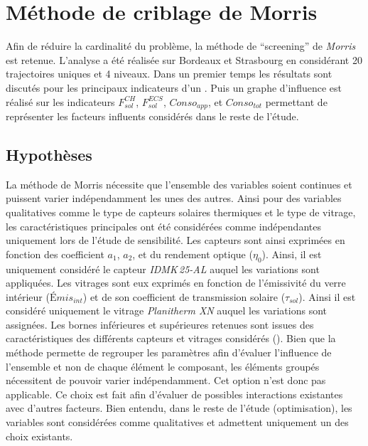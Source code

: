 \section{Méthode de criblage de Morris} %
\label{sec:methode_criblage_de_morris}
Afin de réduire la cardinalité du problème, la méthode de \enquote{screening} de
\textit{Morris} est retenue. L’analyse a été réalisée sur Bordeaux et Strasbourg en
considérant \num{20} trajectoires uniques et \num{4} niveaux. Dans un premier temps les
résultats sont discutés pour les principaux indicateurs d’un . Puis un graphe
d’influence est réalisé sur les indicateurs $F_{sol}^{CH}$, $F_{sol}^{ECS}$,
$Conso_{app}$, et $Conso_{tot}$ permettant de représenter les facteurs influents
considérés dans le reste de l’étude.

\subsection{Hypothèses} %
\label{sub:hypotheses}
La méthode de Morris nécessite que l’ensemble des variables soient continues
et puissent varier indépendamment les unes des autres. Ainsi pour des variables
qualitatives comme le type de capteurs solaires thermiques et le type de vitrage,
les caractéristiques principales ont été considérées comme indépendantes uniquement
lors de l’étude de sensibilité.
Les capteurs sont ainsi exprimées en fonction des coefficient $a_{1}$, $a_{2}$, et
du rendement optique ($\eta_{0}$). Ainsi, il est uniquement considéré le capteur
\textit{IDMK\,25-AL} auquel les variations sont appliquées.
Les vitrages sont eux exprimés en fonction de l’émissivité
du verre intérieur ($Émis_{int}$) et de son coefficient de transmission solaire ($\tau_{sol}$).
Ainsi il est considéré uniquement le vitrage \textit{Planitherm XN} auquel les variations
sont assignées. Les bornes inférieures et supérieures retenues sont issues des caractéristiques
des différents capteurs et vitrages considérés ().
Bien que la méthode permette de regrouper les paramètres afin d’évaluer
l’influence de l’ensemble et non de chaque élément le composant, les éléments groupés
nécessitent de pouvoir varier indépendamment. Cet option n’est donc pas applicable.
Ce choix est fait afin d’évaluer de possibles interactions existantes avec d’autres facteurs.
Bien entendu, dans le reste de l’étude (optimisation), les variables sont
considérées comme qualitatives et admettent uniquement un des choix existants.

